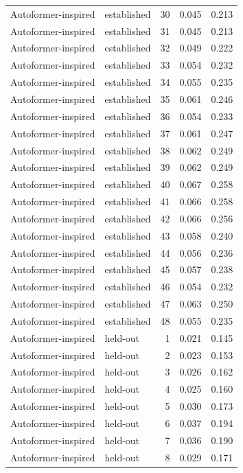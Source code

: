 \begin{tabular}{llrrr}
Autoformer-inspired & established & 30 & 0.045 & 0.213 \\
Autoformer-inspired & established & 31 & 0.045 & 0.213 \\
Autoformer-inspired & established & 32 & 0.049 & 0.222 \\
Autoformer-inspired & established & 33 & 0.054 & 0.232 \\
Autoformer-inspired & established & 34 & 0.055 & 0.235 \\
Autoformer-inspired & established & 35 & 0.061 & 0.246 \\
Autoformer-inspired & established & 36 & 0.054 & 0.233 \\
Autoformer-inspired & established & 37 & 0.061 & 0.247 \\
Autoformer-inspired & established & 38 & 0.062 & 0.249 \\
Autoformer-inspired & established & 39 & 0.062 & 0.249 \\
Autoformer-inspired & established & 40 & 0.067 & 0.258 \\
Autoformer-inspired & established & 41 & 0.066 & 0.258 \\
Autoformer-inspired & established & 42 & 0.066 & 0.256 \\
Autoformer-inspired & established & 43 & 0.058 & 0.240 \\
Autoformer-inspired & established & 44 & 0.056 & 0.236 \\
Autoformer-inspired & established & 45 & 0.057 & 0.238 \\
Autoformer-inspired & established & 46 & 0.054 & 0.232 \\
Autoformer-inspired & established & 47 & 0.063 & 0.250 \\
Autoformer-inspired & established & 48 & 0.055 & 0.235 \\
Autoformer-inspired & held-out & 1 & 0.021 & 0.145 \\
Autoformer-inspired & held-out & 2 & 0.023 & 0.153 \\
Autoformer-inspired & held-out & 3 & 0.026 & 0.162 \\
Autoformer-inspired & held-out & 4 & 0.025 & 0.160 \\
Autoformer-inspired & held-out & 5 & 0.030 & 0.173 \\
Autoformer-inspired & held-out & 6 & 0.037 & 0.194 \\
Autoformer-inspired & held-out & 7 & 0.036 & 0.190 \\
Autoformer-inspired & held-out & 8 & 0.029 & 0.171 \\

\end{tabular}
